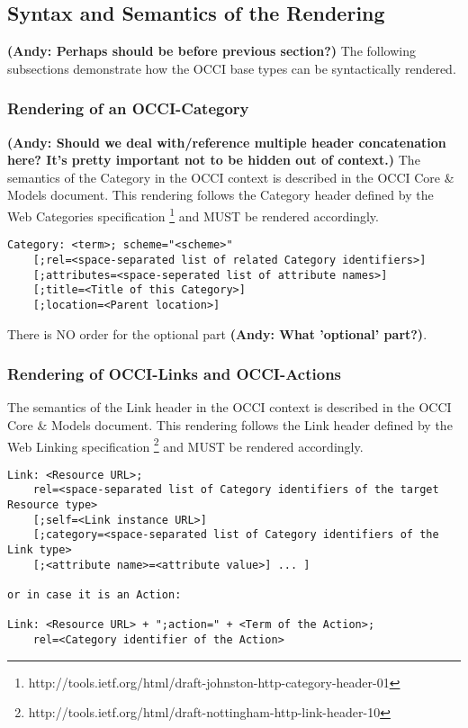 \documentclass[10pt,a4paper]{article}
\begin{document}
\subsection{Syntax and Semantics of the Rendering}
\label{sec:syntax}

\textbf{(Andy: Perhaps should be before previous section?)}
The following subsections demonstrate how the OCCI base types can be
syntactically rendered.

\subsubsection{Rendering of an OCCI-Category}
\textbf{(Andy: Should we deal with/reference multiple header concatenation here? 
It's pretty important not to be hidden out of context.)}
The semantics of the Category in the OCCI context is described in the
OCCI Core \& Models document. This rendering follows the
  Category header defined by the Web Categories specification
  \footnote{http://tools.ietf.org/html/draft-johnston-http-category-header-01} 
  and MUST be rendered accordingly.

\begin{verbatim}
Category: <term>; scheme="<scheme>"
    [;rel=<space-separated list of related Category identifiers>]
    [;attributes=<space-seperated list of attribute names>]
    [;title=<Title of this Category>]    
    [;location=<Parent location>]
\end{verbatim}
There is NO order for the optional part \textbf{(Andy: What 'optional' part?)}.

\subsubsection{Rendering of OCCI-Links and OCCI-Actions}
The semantics of the Link header in the OCCI context is described in
the OCCI Core \& Models document. This rendering follows the
  Link header defined by the Web Linking specification
  \footnote{http://tools.ietf.org/html/draft-nottingham-http-link-header-10} and
  MUST be rendered accordingly.

\begin{verbatim}
Link: <Resource URL>;
    rel=<space-separated list of Category identifiers of the target Resource type>
    [;self=<Link instance URL>]
    [;category=<space-separated list of Category identifiers of the Link type>
    [;<attribute name>=<attribute value>] ... ]

or in case it is an Action:

Link: <Resource URL> + ";action=" + <Term of the Action>;
    rel=<Category identifier of the Action>
\end{verbatim}
\end{document}
